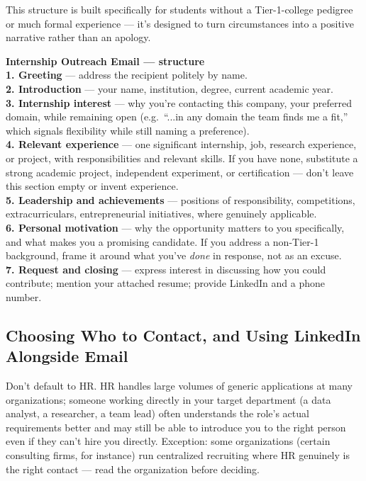 This structure is built specifically for students without a Tier-1-college pedigree or much formal experience
— it's designed to turn circumstances into a positive narrative rather than an apology.

\begin{template}
\textbf{Internship Outreach Email — structure}\\[4pt]
\textbf{1. Greeting} --- address the recipient politely by name.\\[4pt]
\textbf{2. Introduction} --- your name, institution, degree, current academic year.\\[4pt]
\textbf{3. Internship interest} --- why you're contacting this company, your preferred domain, while remaining
open (e.g.\ ``...in any domain the team finds me a fit,'' which signals flexibility while still naming a
preference).\\[4pt]
\textbf{4. Relevant experience} --- one significant internship, job, research experience, or project, with
responsibilities and relevant skills. If you have none, substitute a strong academic project, independent
experiment, or certification — don't leave this section empty or invent experience.\\[4pt]
\textbf{5. Leadership and achievements} --- positions of responsibility, competitions, extracurriculars,
entrepreneurial initiatives, where genuinely applicable.\\[4pt]
\textbf{6. Personal motivation} --- why the opportunity matters to you specifically, and what makes you a
promising candidate. If you address a non-Tier-1 background, frame it around what you've \emph{done} in
response, not as an excuse.\\[4pt]
\textbf{7. Request and closing} --- express interest in discussing how you could contribute; mention your
attached resume; provide LinkedIn and a phone number.
\end{template}

\subsection{Choosing Who to Contact, and Using LinkedIn Alongside Email}

Don't default to HR. HR handles large volumes of generic applications at many organizations; someone working
directly in your target department (a data analyst, a researcher, a team lead) often understands the role's
actual requirements better and may still be able to introduce you to the right person even if they can't hire
you directly. Exception: some organizations (certain consulting firms, for instance) run centralized recruiting
where HR genuinely is the right contact — read the organization before deciding.

